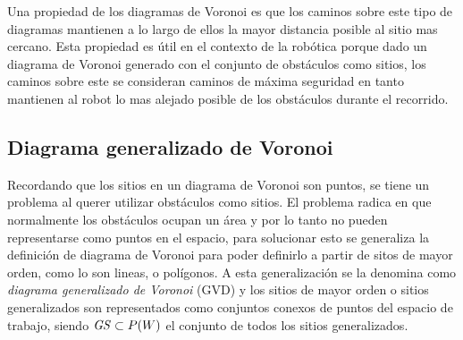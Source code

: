 Una propiedad de los diagramas de Voronoi es que los caminos sobre este tipo de diagramas mantienen a lo largo de ellos la mayor distancia posible al sitio mas cercano.
Esta propiedad es útil en el contexto de la robótica porque dado un diagrama de Voronoi generado con el conjunto de obstáculos como sitios, los caminos sobre este se consideran caminos de máxima seguridad en tanto mantienen al robot lo mas alejado posible de los obstáculos durante el recorrido.


\subsection{Diagrama generalizado de Voronoi}
Recordando que los sitios en un diagrama de Voronoi son puntos, se tiene un problema al querer utilizar obstáculos como sitios. El problema radica en que normalmente los obstáculos ocupan un área y por lo tanto  no pueden representarse como puntos en el espacio, para solucionar esto se generaliza la definición de diagrama de Voronoi para poder definirlo a partir de sitos de mayor orden, como lo son lineas, o polígonos. A esta generalización se la denomina como \emph{diagrama generalizado de Voronoi} (GVD) y los sitios de mayor orden o sitios generalizados son representados como conjuntos conexos de puntos del espacio de trabajo, siendo $\mathit{GS}\subset P(W)$ el conjunto de todos los sitios generalizados.


